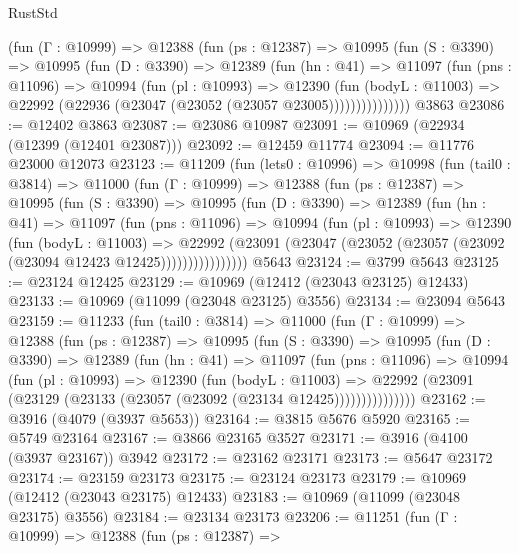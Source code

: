 \begin{lexlean}{RustStd}
\begin{coremodule}
          (fun (Γ : @10999) =>
          @12388
            (fun (ps : @12387) =>
            @10995
              (fun (S : @3390) =>
              @10995
                (fun (D : @3390) =>
                @12389
                  (fun (hn : @41) =>
                  @11097
                    (fun (pns : @11096) =>
                    @10994
                      (fun (pl : @10993) =>
                      @12390
                        (fun (bodyL : @11003) =>
                        @22992 (@22936 (@23047 (@23052 (@23057 @23005)))))))))))))))
    @3863
@23086 := @12402 @3863
@23087 := @23086 @10987
@23091 := @10969 (@22934 (@12399 (@12401 @23087)))
@23092 := @12459 @11774
@23094 := @11776 @23000 @12073
@23123 := @11209
    (fun (lets0 : @10996) =>
    @10998
      (fun (tail0 : @3814) =>
      @11000
        (fun (Γ : @10999) =>
        @12388
          (fun (ps : @12387) =>
          @10995
            (fun (S : @3390) =>
            @10995
              (fun (D : @3390) =>
              @12389
                (fun (hn : @41) =>
                @11097
                  (fun (pns : @11096) =>
                  @10994
                    (fun (pl : @10993) =>
                    @12390
                      (fun (bodyL : @11003) =>
                      @22992
                        (@23091
                          (@23047 (@23052 (@23057 (@23092 (@23094 @12423 @12425))))))))))))))))
    @5643
@23124 := @3799 @5643
@23125 := @23124 @12425
@23129 := @10969 (@12412 (@23043 @23125) @12433)
@23133 := @10969 (@11099 (@23048 @23125) @3556)
@23134 := @23094 @5643
@23159 := @11233
    (fun (tail0 : @3814) =>
    @11000
      (fun (Γ : @10999) =>
      @12388
        (fun (ps : @12387) =>
        @10995
          (fun (S : @3390) =>
          @10995
            (fun (D : @3390) =>
            @12389
              (fun (hn : @41) =>
              @11097
                (fun (pns : @11096) =>
                @10994
                  (fun (pl : @10993) =>
                  @12390
                    (fun (bodyL : @11003) =>
                    @22992 (@23091 (@23129 (@23133 (@23057 (@23092 (@23134 @12425)))))))))))))))
@23162 := @3916 (@4079 (@3937 @5653))
@23164 := @3815 @5676 @5920
@23165 := @5749 @23164
@23167 := @3866 @23165 @3527
@23171 := @3916 (@4100 (@3937 @23167)) @3942
@23172 := @23162 @23171
@23173 := @5647 @23172
@23174 := @23159 @23173
@23175 := @23124 @23173
@23179 := @10969 (@12412 (@23043 @23175) @12433)
@23183 := @10969 (@11099 (@23048 @23175) @3556)
@23184 := @23134 @23173
@23206 := @11251
    (fun (Γ : @10999) =>
    @12388
      (fun (ps : @12387) =>

\end{coremodule}
\end{lexlean}
